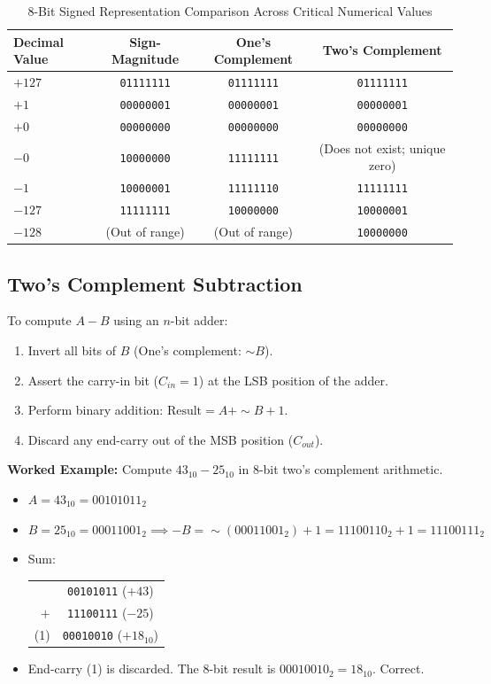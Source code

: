 \begin{table}[htbp]
\centering
\small
\caption{8-Bit Signed Representation Comparison Across Critical Numerical Values}
\label{tab:signed_representations}
\begin{tabularx}{0.75\textwidth}{X c c c}
\toprule
\textbf{Decimal Value} & \textbf{Sign-Magnitude} & \textbf{One's Complement} & \textbf{Two's Complement} \\
\midrule
$+127$ & \texttt{01111111} & \texttt{01111111} & \texttt{01111111} \\
$+1$ & \texttt{00000001} & \texttt{00000001} & \texttt{00000001} \\
$+0$ & \texttt{00000000} & \texttt{00000000} & \texttt{00000000} \\
$-0$ & \texttt{10000000} & \texttt{11111111} & (Does not exist; unique zero) \\
$-1$ & \texttt{10000001} & \texttt{11111110} & \texttt{11111111} \\
$-127$ & \texttt{11111111} & \texttt{10000000} & \texttt{10000001} \\
$-128$ & (Out of range) & (Out of range) & \texttt{10000000} \\
\bottomrule
\end{tabularx}
\end{table}

\subsection{Two's Complement Subtraction}
To compute $A - B$ using an $n$-bit adder:
\begin{enumerate}[label=\bfseries\arabic*.]
    \item Invert all bits of $B$ (One's complement: $\sim B$).
    \item Assert the carry-in bit ($C_{in} = 1$) at the LSB position of the adder.
    \item Perform binary addition: $\text{Result} = A + \sim B + 1$.
    \item Discard any end-carry out of the MSB position ($C_{out}$).
\end{enumerate}

\textbf{Worked Example:} Compute $43_{10} - 25_{10}$ in 8-bit two's complement arithmetic.
\begin{itemize}
    \item $A = 43_{10} = 00101011_2$
    \item $B = 25_{10} = 00011001_2 \implies -B = \sim(00011001_2) + 1 = 11100110_2 + 1 = 11100111_2$
    \item Sum:
    \begin{center}
    \begin{tabular}{r c}
      & \texttt{00101011} \quad ($+43$) \\
    $+$ & \texttt{11100111} \quad ($-25$) \\
    \hline
    (1) & \texttt{00010010} \quad ($+18_{10}$)
    \end{tabular}
    \end{center}
    \item End-carry (1) is discarded. The 8-bit result is $00010010_2 = 18_{10}$. Correct.
\end{itemize}


